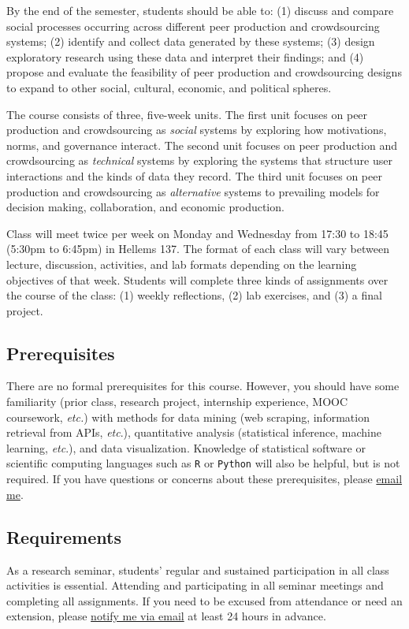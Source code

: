 \documentclass[10pt]{memoir}
\def\myclassroom{Hellems 137}
\begin{document}
By the end of the semester, students should be able to: (1) discuss and compare social processes occurring across different peer production and crowdsourcing systems; (2) identify and collect data generated by these systems; (3) design exploratory research using these data and interpret their findings; and (4) propose and evaluate the feasibility of peer production and crowdsourcing designs to expand to other social, cultural, economic, and political spheres.

The course consists of three, five-week units. The first unit focuses on peer production and crowdsourcing as \textit{social} systems by exploring how motivations, norms, and governance interact. The second unit focuses on peer production and crowdsourcing as \textit{technical} systems by exploring the systems that structure user interactions and the kinds of data they record. The third unit focuses on peer production and crowdsourcing as \textit{alternative} systems to prevailing models for decision making, collaboration, and economic production.

Class will meet twice per week on Monday and Wednesday from 17:30 to 18:45 (5:30pm to 6:45pm) in \myclassroom. The format of each class will vary between lecture, discussion, activities, and lab formats depending on the learning objectives of that week. Students will complete three kinds of assignments over the course of the class: (1) weekly reflections, (2) lab exercises, and (3) a final project.

\subsection{Prerequisites}
There are no formal prerequisites for this course. However, you should have some familiarity (prior class, research project, internship experience, MOOC coursework, \textit{etc.}) with methods for data mining (web scraping, information retrieval from APIs, \textit{etc}.), quantitative analysis (statistical inference, machine learning, \textit{etc}.), and data visualization. Knowledge of statistical software or scientific computing languages such as \texttt{R} or \texttt{Python} will also be helpful, but is not required. If you have questions or concerns about these prerequisites, please \href{mailto:brian.keegan@colorado.edu}{email me}.

\subsection{Requirements}
As a research seminar, students' regular and sustained participation in all class activities is essential. Attending and participating in all seminar meetings and completing all assignments. If you need to be excused from attendance or need an extension, please \href{mailto:brian.keegan@colorado.edu}{notify me via email} at least 24 hours in advance.
\end{document}
